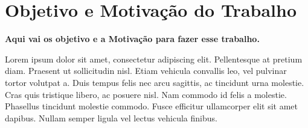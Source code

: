 \section{Objetivo e Motivação do Trabalho}
\textbf{Aqui vai os objetivo e a Motivação para fazer esse trabalho.}


Lorem ipsum dolor sit amet, consectetur adipiscing elit. Pellentesque at pretium
diam. Praesent ut sollicitudin nisl. Etiam vehicula convallis leo, vel pulvinar tortor
volutpat a. Duis tempus felis nec arcu sagittis, ac tincidunt urna molestie. Cras quis
tristique libero, ac posuere nisl. Nam commodo id felis a molestie. Phasellus tincidunt
molestie commodo. Fusce efficitur ullamcorper elit sit amet dapibus. Nullam semper
ligula vel lectus vehicula finibus.